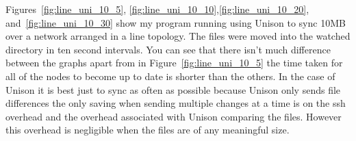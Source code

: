 \documentclass[12pt]{article}
\begin{document}

Figures~\ref{fig:line_uni_10_5},
\ref{fig:line_uni_10_10},\ref{fig:line_uni_10_20},
and~\ref{fig:line_uni_10_30} show my program running
using Unison to sync 10MB over a network arranged in
a line topology. The files were moved into the watched
directory in ten second intervals. You can see that there isn't much
difference between the graphs apart from in Figure~\ref{fig:line_uni_10_5} 
the time taken for all of the nodes to become up to date
is shorter than the others. In the case of Unison it
is best just to sync as often as possible because Unison
only sends file differences the only saving when sending
multiple changes at a time is on the ssh overhead
and the overhead associated with Unison comparing the
files. However this overhead is negligible when the files
are of any meaningful size.
\end{document}

